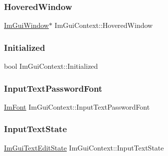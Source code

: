 \subsubsection{\texorpdfstring{Hovered\+Window}{HoveredWindow}}
{\footnotesize\ttfamily \hyperlink{struct_im_gui_window}{Im\+Gui\+Window}$\ast$ Im\+Gui\+Context\+::\+Hovered\+Window}

\hypertarget{struct_im_gui_context_a71b32432f5c4658b4772b293640a66c0}{}\label{struct_im_gui_context_a71b32432f5c4658b4772b293640a66c0} 
\subsubsection{\texorpdfstring{Initialized}{Initialized}}
{\footnotesize\ttfamily bool Im\+Gui\+Context\+::\+Initialized}

\hypertarget{struct_im_gui_context_a6aa67b9b778bd741d9866ec34cc8ee8b}{}\label{struct_im_gui_context_a6aa67b9b778bd741d9866ec34cc8ee8b} 
\subsubsection{\texorpdfstring{Input\+Text\+Password\+Font}{InputTextPasswordFont}}
{\footnotesize\ttfamily \hyperlink{struct_im_font}{Im\+Font} Im\+Gui\+Context\+::\+Input\+Text\+Password\+Font}

\hypertarget{struct_im_gui_context_ae8626ef18bc5a848691a0c50e2c0f7ae}{}\label{struct_im_gui_context_ae8626ef18bc5a848691a0c50e2c0f7ae} 
\subsubsection{\texorpdfstring{Input\+Text\+State}{InputTextState}}
{\footnotesize\ttfamily \hyperlink{struct_im_gui_text_edit_state}{Im\+Gui\+Text\+Edit\+State} Im\+Gui\+Context\+::\+Input\+Text\+State}

\hypertarget{struct_im_gui_context_add4fdcc8c6a437d8f8e7c837418be83c}{}\label{struct_im_gui_context_add4fdcc8c6a437d8f8e7c837418be83c} 
